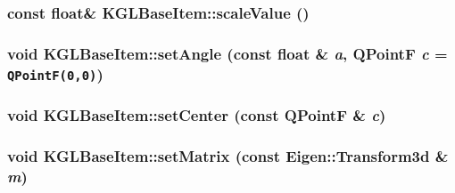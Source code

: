 \hypertarget{class_k_g_l_base_item_eeb20ccf94f92b5813a291cd2436dd63}{
\subsubsection[{scaleValue}]{\setlength{\rightskip}{0pt plus 5cm}const float\& KGLBaseItem::scaleValue ()}}
\label{class_k_g_l_base_item_eeb20ccf94f92b5813a291cd2436dd63}


\hypertarget{class_k_g_l_base_item_a281df5a9d5d601635956268809bc67e}{
\subsubsection[{setAngle}]{\setlength{\rightskip}{0pt plus 5cm}void KGLBaseItem::setAngle (const float \& {\em a}, \/  QPointF {\em c} = {\tt QPointF(0,0)})}}
\label{class_k_g_l_base_item_a281df5a9d5d601635956268809bc67e}


\hypertarget{class_k_g_l_base_item_85c4af1445672402e3b47735e2bbf415}{
\subsubsection[{setCenter}]{\setlength{\rightskip}{0pt plus 5cm}void KGLBaseItem::setCenter (const QPointF \& {\em c})}}
\label{class_k_g_l_base_item_85c4af1445672402e3b47735e2bbf415}


\hypertarget{class_k_g_l_base_item_1897bc88d905d28ff05ac177c0619060}{
\subsubsection[{setMatrix}]{\setlength{\rightskip}{0pt plus 5cm}void KGLBaseItem::setMatrix (const Eigen::Transform3d \& {\em m})}}
\label{class_k_g_l_base_item_1897bc88d905d28ff05ac177c0619060}


